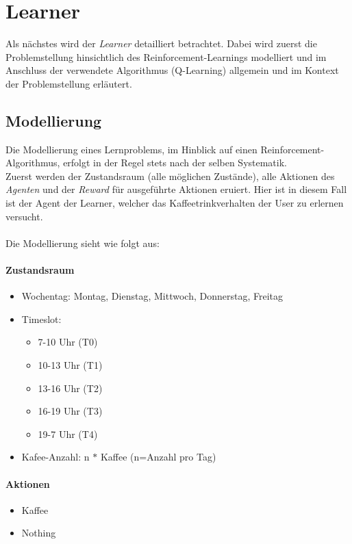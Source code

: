 \newpage
\section{Learner}
\label{sec:ql}
Als nächstes wird der \textit{Learner} detailliert betrachtet. Dabei wird zuerst die Problemstellung hinsichtlich des Reinforcement-Learnings modelliert und im Anschluss der verwendete Algorithmus (Q-Learning) allgemein und im Kontext der Problemstellung erläutert.

\subsection{Modellierung}
\label{subsec:modulation}
Die Modellierung eines Lernproblems, im Hinblick auf einen Reinforcement-Algorithmus, erfolgt in der Regel stets nach der selben Systematik. \\
Zuerst werden der Zustandsraum (alle möglichen Zustände), alle Aktionen des \textit{Agenten} und der \textit{Reward} für ausgeführte Aktionen eruiert.
Hier ist in diesem Fall ist der Agent der Learner, welcher das Kaffeetrinkverhalten der User zu erlernen versucht.\\\\
Die Modellierung sieht wie folgt aus: 
\paragraph{Zustandsraum}
\begin{itemize}
	\item Wochentag: Montag, Dienstag, Mittwoch, Donnerstag, Freitag
	\item Timeslot:
	      \begin{itemize}
	      	\item 7-10 Uhr (T0)
	      	\item 10-13 Uhr (T1)
	      	\item 13-16 Uhr (T2)
	      	\item 16-19 Uhr (T3)
	      	\item 19-7 Uhr (T4)
	      \end{itemize} 
	\item Kafee-Anzahl: n $*$ Kaffee (n=Anzahl pro Tag)
\end{itemize}

\paragraph{Aktionen}
\begin{itemize}
	\item Kaffee
	\item Nothing
\end{itemize}

